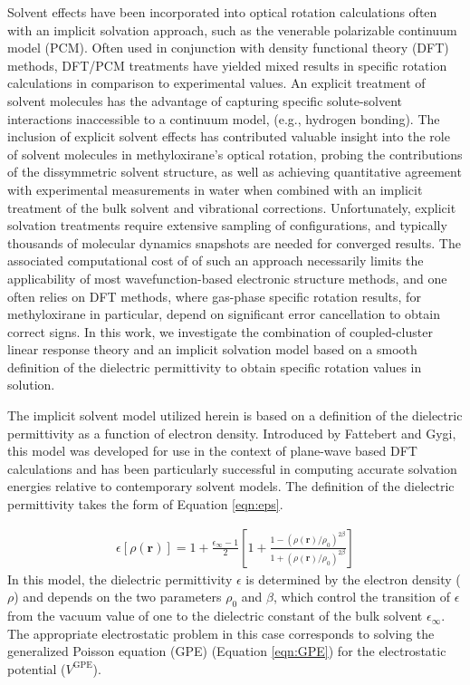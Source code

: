 Solvent effects have been incorporated into optical rotation calculations
often with an implicit solvation approach, such as the
venerable polarizable continuum model (PCM).\cite{Miertus:81,Tomasi:05}
Often used in conjunction with density functional theory (DFT) methods,
DFT/PCM treatments have yielded mixed results in specific rotation
calculations in comparison to experimental values.\cite{Mennucci:02,
Kongsted:08,Lahiri:13}
An explicit treatment of solvent molecules has the advantage of capturing
specific solute-solvent interactions inaccessible to a continuum model,
(e.g., hydrogen bonding). The inclusion of explicit solvent effects
has contributed valuable insight into the role of solvent molecules
in methyloxirane's optical rotation, probing the contributions of
the dissymmetric solvent structure,\cite{Beratan:06,Beratan:07}
as well as achieving quantitative agreement with experimental measurements
in water when combined with an implicit treatment of the bulk solvent
and vibrational corrections.\cite{Lipparini:13} Unfortunately, 
explicit solvation treatments require extensive sampling of configurations, 
and typically thousands of molecular dynamics snapshots are needed for converged
results.\cite{Beratan:06,Beratan:07,Lipparini:13} The associated computational
cost of of such an approach necessarily limits the applicability of most
wavefunction-based electronic structure methods, and one often relies on
DFT methods, where gas-phase specific rotation results, for methyloxirane
in particular, depend on significant error cancellation to obtain correct
signs.\cite{Kongsted:06} In this work, we investigate the combination of
coupled-cluster linear response theory and an implicit solvation model
based on a smooth definition of the dielectric permittivity to obtain
specific rotation values in solution.

The implicit solvent model utilized herein is based on a definition
of the dielectric permittivity as a function of electron density. 
Introduced by Fattebert and Gygi\cite{Fattebert:02,Fattebert:03},
this model was developed for use in the context of plane-wave based DFT
calculations
\cite{Scherlis:06,Andreussi:12,Dziedzic:11,Dziedzic:13,Fox:14}
and has been particularly successful in computing accurate solvation
energies relative to contemporary solvent models.\cite{Dziedzic:11,
Dziedzic:13}
The definition of the dielectric permittivity takes the form of Equation
\ref{eqn:eps}.

\begin{align}
\epsilon[\rho({\mathbf{r}})] = 1 + \frac{\epsilon_\infty-1}{2}\left[1+\frac{1-\left(
\rho({\mathbf{r}})/\rho_0\right)^{2\beta}}{1+(\rho({\mathbf{r}})/\rho_0)^
{2\beta}}\right]
\label{eqn:eps}
\end{align}
In this model, the dielectric permittivity $\epsilon$ is determined by the
electron density
($\rho$) and depends on the two parameters $\rho_0$ and $\beta$, which
control the transition of $\epsilon$ from the vacuum value of one to the
dielectric constant of the bulk solvent $\epsilon_\infty$. The appropriate electrostatic problem
in this case corresponds to solving the generalized Poisson equation (GPE)
(Equation \ref{eqn:GPE}) for the electrostatic potential ($V^\mathrm{GPE}$).

